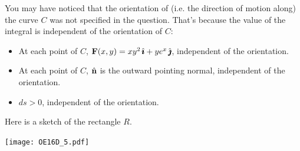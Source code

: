 \begin{solution} 
You may have noticed that the orientation of (i.e. the direction of motion along) the curve $C$ was not specified in the question. That's because the value of the integral is independent of the orientation of $C$:
\begin{itemize}\itemsep1pt \parskip0pt 
\item At each point of $C$, $\mathbf{F}(x,y) = xy^2 \,\hat{\pmb{\imath}} + ye^x \,\hat{\pmb{\jmath}}$, independent of the orientation. 
\item At each point of $C$, $\hat{\mathbf{n}}$ is the outward pointing normal, independent of the orientation.
\item $ds>0$, independent of the orientation.   
\end{itemize}
Here is a sketch of the rectangle $R$.

\begin{center}
     \texttt{[image: OE16D\_5.pdf]}\
\end{center}


\end{solution}
